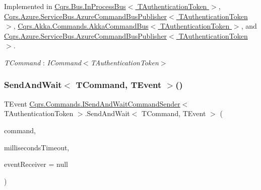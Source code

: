 Implemented in \hyperlink{classCqrs_1_1Bus_1_1InProcessBus_a506d617dc7ec3838791a91e09b73b8ce_a506d617dc7ec3838791a91e09b73b8ce}{Cqrs.\+Bus.\+In\+Process\+Bus$<$ T\+Authentication\+Token $>$}, \hyperlink{classCqrs_1_1Azure_1_1ServiceBus_1_1AzureCommandBusPublisher_a6051d608d81618549709731471ca904a_a6051d608d81618549709731471ca904a}{Cqrs.\+Azure.\+Service\+Bus.\+Azure\+Command\+Bus\+Publisher$<$ T\+Authentication\+Token $>$}, \hyperlink{classCqrs_1_1Akka_1_1Commands_1_1AkkaCommandBus_a10ed94fc318977777e2e6cc970b8953e_a10ed94fc318977777e2e6cc970b8953e}{Cqrs.\+Akka.\+Commands.\+Akka\+Command\+Bus$<$ T\+Authentication\+Token $>$}, and \hyperlink{classCqrs_1_1Azure_1_1ServiceBus_1_1AzureCommandBusPublisher_a6051d608d81618549709731471ca904a_a6051d608d81618549709731471ca904a}{Cqrs.\+Azure.\+Service\+Bus.\+Azure\+Command\+Bus\+Publisher$<$ T\+Authentication\+Token $>$}.

\begin{Desc}
\item[Type Constraints]\begin{description}
\item[{\em T\+Command} : {\em I\+Command$<$T\+Authentication\+Token$>$}]\end{description}
\end{Desc}
\mbox{\label{interfaceCqrs_1_1Commands_1_1ISendAndWaitCommandSender_aceee36522f8b677f3737ff0f9f2165ad_aceee36522f8b677f3737ff0f9f2165ad}} 
\subsubsection{\texorpdfstring{Send\+And\+Wait$<$ T\+Command, T\+Event $>$()}{SendAndWait< TCommand, TEvent >()}\hspace{0.1cm}{\footnotesize\ttfamily [2/6]}}
{\footnotesize\ttfamily T\+Event \hyperlink{interfaceCqrs_1_1Commands_1_1ISendAndWaitCommandSender}{Cqrs.\+Commands.\+I\+Send\+And\+Wait\+Command\+Sender}$<$ T\+Authentication\+Token $>$.Send\+And\+Wait$<$ T\+Command, T\+Event $>$ (\begin{DoxyParamCaption}\item[{T\+Command}]{command,  }\item[{int}]{milliseconds\+Timeout,  }\item[{\hyperlink{interfaceCqrs_1_1Events_1_1IEventReceiver}{I\+Event\+Receiver}$<$ T\+Authentication\+Token $>$}]{event\+Receiver = {\ttfamily null} }\end{DoxyParamCaption})}




